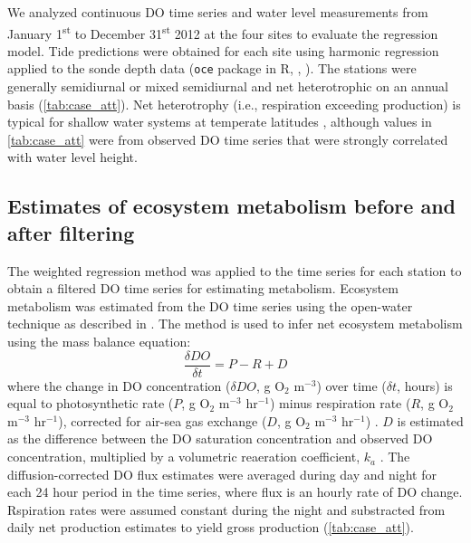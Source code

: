 \documentclass[letterpaper,12pt,oneside]{article}\usepackage[]{graphicx}\usepackage[]{color}
\begin{document}
We analyzed continuous \ac{DO} time series and water level measurements from January 1\textsuperscript{st} to December 31\textsuperscript{st} 2012 at the four sites to evaluate the regression model.  Tide predictions were obtained for each site using harmonic regression applied to the sonde depth data (\texttt{oce} package in R, \citealt{Foreman89}, ). The stations were generally semidiurnal or mixed semidiurnal and net heterotrophic on an annual basis (\cref{tab:case_att}).  Net heterotrophy (i.e., respiration exceeding production) is typical for shallow water systems at temperate latitudes \citep{Caffrey03}, although values in \cref{tab:case_att} were from observed \ac{DO} time series that were strongly correlated with water level height.

\subsection{Estimates of ecosystem metabolism before and after filtering} \label{met_sec}

The weighted regression method was applied to the time series for each station to obtain a filtered \ac{DO} time series for estimating metabolism.  Ecosystem metabolism was estimated from the \ac{DO} time series using the open-water technique \citep{Odum56} as described in \citet{Caffrey13}.  The method is used to infer net ecosystem metabolism using the mass balance equation:
\begin{equation} \label{metrate}
\frac{\delta DO}{\delta t} = P - R + D
\end{equation}
where the change in \ac{DO} concentration ($\delta DO$, g O$_2$ m$^{-3}$) over time ($\delta t$, hours) is equal to photosynthetic rate ($P$, g O$_2$ m$^{-3}$ hr$^{-1}$) minus respiration rate ($R$, g O$_2$ m$^{-3}$ hr$^{-1}$), corrected for air-sea gas exchange ($D$, g O$_2$ m$^{-3}$ hr$^{-1}$) \citep{Caffrey13}. $D$ is estimated as the difference between the \ac{DO} saturation concentration and observed \ac{DO} concentration, multiplied by a volumetric reaeration coefficient, $k_a$ \citep{Thebault08}.  The diffusion-corrected \ac{DO} flux estimates were averaged during day and night for each 24 hour period in the time series, where flux is an hourly rate of \ac{DO} change.  Rspiration rates were assumed constant during the night and substracted from daily net production estimates to yield gross production (\cref{tab:case_att}).  
\end{document}
